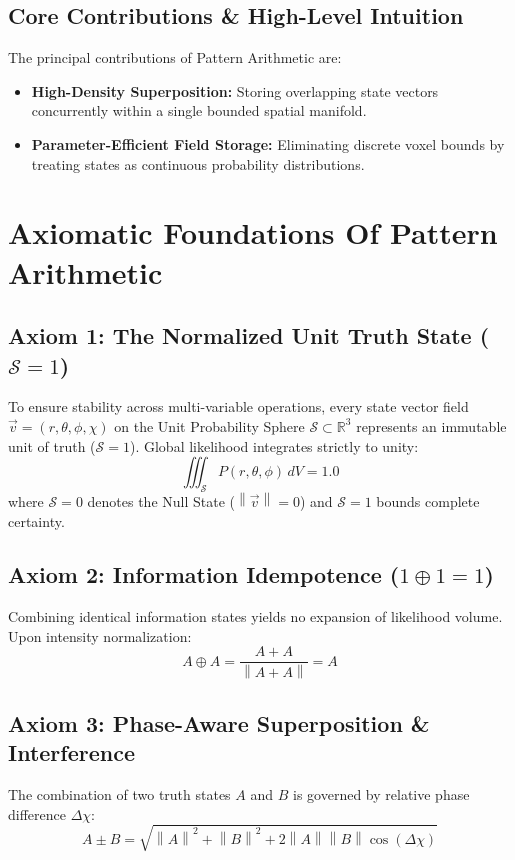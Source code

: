 \documentclass[12pt, a4paper]{article}
\providecommand{\norm}[1]{\left\lVert#1\right\rVert}
\begin{document}
\subsection{Core Contributions \& High-Level Intuition}
The principal contributions of Pattern Arithmetic are:
\begin{itemize}
    \item \textbf{High-Density Superposition:} Storing overlapping state vectors concurrently within a single bounded spatial manifold.
    \item \textbf{Parameter-Efficient Field Storage:} Eliminating discrete voxel bounds by treating states as continuous probability distributions.
\end{itemize}

\section{Axiomatic Foundations Of Pattern Arithmetic}

\subsection{Axiom 1: The Normalized Unit Truth State ($\mathcal{S} = 1$)}
\label{subsec:axiom1}
To ensure stability across multi-variable operations, every state vector field $\vec{v} = (r, \theta, \phi, \chi)$ on the Unit Probability Sphere $\mathcal{S} \subset \mathbb{R}^3$ represents an immutable unit of truth ($\mathcal{S} = 1$). Global likelihood integrates strictly to unity:
\begin{equation}
    \iiint_{\mathcal{S}} P(r, \theta, \phi) \, dV = 1.0
    \label{eq:unit_truth}
\end{equation}
where $\mathcal{S} = 0$ denotes the Null State ($\norm{\vec{v}} = 0$) and $\mathcal{S} = 1$ bounds complete certainty.

\subsection{Axiom 2: Information Idempotence ($1 \oplus 1 = 1$)}
\label{subsec:axiom2}
Combining identical information states yields no expansion of likelihood volume. Upon intensity normalization:
\begin{equation}
    A \oplus A = \frac{A + A}{\norm{A + A}} = A
    \label{eq:idempotence_formal}
\end{equation}

\subsection{Axiom 3: Phase-Aware Superposition \& Interference}
\label{subsec:axiom3}
The combination of two truth states $A$ and $B$ is governed by relative phase difference $\Delta\chi$:
\begin{equation}
    A \pm B = \sqrt{\norm{A}^2 + \norm{B}^2 + 2\norm{A}\norm{B}\cos(\Delta\chi)}
    \label{eq:interference_formal}
\end{equation}
\end{document}
